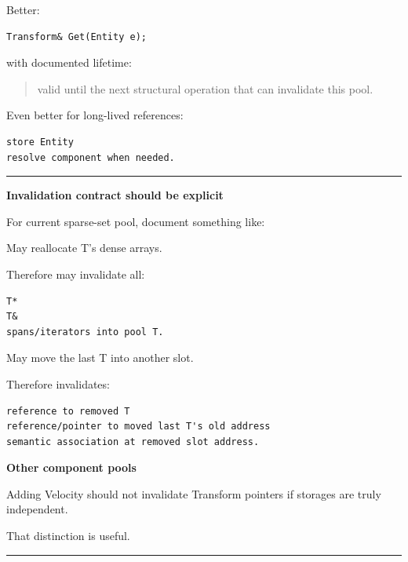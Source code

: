 Better:

\begin{verbatim}
Transform& Get(Entity e);
\end{verbatim}

with documented lifetime:

\begin{quote}
valid until the next structural operation that can invalidate this pool.
\end{quote}

Even better for long-lived references:

\begin{verbatim}
store Entity
resolve component when needed.
\end{verbatim}

\begin{center}\rule{0.5\linewidth}{0.5pt}\end{center}

\textbf{Invalidation contract should be explicit}

For current sparse-set pool, document something like:

\textbf{}

May reallocate T's dense arrays.

Therefore may invalidate all:

\begin{verbatim}
T*
T&
spans/iterators into pool T.
\end{verbatim}

\textbf{}

May move the last T into another slot.

Therefore invalidates:

\begin{verbatim}
reference to removed T
reference/pointer to moved last T's old address
semantic association at removed slot address.
\end{verbatim}

\textbf{Other component pools}

Adding Velocity should not invalidate Transform pointers if storages are truly independent.

That distinction is useful.

\begin{center}\rule{0.5\linewidth}{0.5pt}\end{center}


